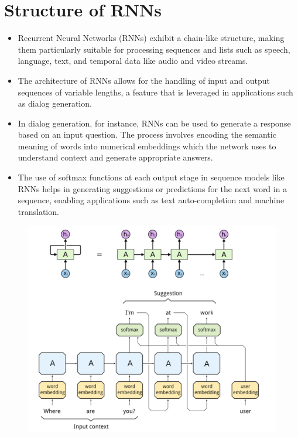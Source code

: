 \section{Structure of RNNs}
\begin{itemize}
    \item Recurrent Neural Networks (RNNs) exhibit a chain-like structure, making them particularly suitable for processing sequences and lists such as speech, language, text, and temporal data like audio and video streams.
    \item The architecture of RNNs allows for the handling of input and output sequences of variable lengths, a feature that is leveraged in applications such as dialog generation.
    \item In dialog generation, for instance, RNNs can be used to generate a response based on an input question. The process involves encoding the semantic meaning of words into numerical embeddings which the network uses to understand context and generate appropriate answers.
    \item The use of softmax functions at each output stage in sequence models like RNNs helps in generating suggestions or predictions for the next word in a sequence, enabling applications such as text auto-completion and machine translation.
\end{itemize}
\begin{figure}[H]
    \centering
    \includegraphics[width=0.5\linewidth]{img/rnn_structure.png}
    
\end{figure}


